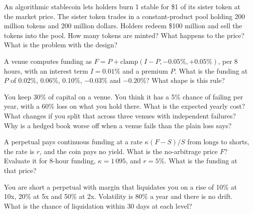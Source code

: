 \begin{question}\label{iq:iv2:crypto-for-traders-and-researchers:17}
An algorithmic stablecoin lets holders burn 1 stable for \$1 of its sister token at the market price. The sister token trades in a constant-product pool holding 200 million tokens and 200 million dollars. Holders redeem \$100 million and sell the tokens into the pool. How many tokens are minted? What happens to the price? What is the problem with the design?
\end{question}

\begin{question}\label{iq:iv2:crypto-for-traders-and-researchers:18}
A venue computes funding as $F = P + \mathrm{clamp}(I - P, -0.05\%, +0.05\%)$, per 8 hours, with an interest term $I = 0.01\%$ and a premium $P$. What is the funding at $P$ of 0.02\%, 0.06\%, 0.10\%, $-0.03\%$ and $-0.20\%$? What shape is this rule?
\end{question}

\begin{question}\label{iq:iv2:crypto-for-traders-and-researchers:19}
You keep 30\% of capital on a venue. You think it has a 5\% chance of failing per year, with a 60\% loss on what you hold there. What is the expected yearly cost? What changes if you split that across three venues with independent failures? Why is a hedged book worse off when a venue fails than the plain loss says?
\end{question}

\begin{question}\label{iq:iv2:crypto-for-traders-and-researchers:20}
A perpetual pays continuous funding at a rate $\kappa(F - S)/S$ from longs to shorts, the rate is $r$, and the coin pays no yield. What is the no-arbitrage price $F$? Evaluate it for 8-hour funding, $\kappa = 1\,095$, and $r = 5\%$. What is the funding at that price?
\end{question}

\begin{question}\label{iq:iv2:crypto-for-traders-and-researchers:21}
You are short a perpetual with margin that liquidates you on a rise of 10\% at 10x, 20\% at 5x and 50\% at 2x. Volatility is 80\% a year and there is no drift. What is the chance of liquidation within 30 days at each level?
\end{question}

